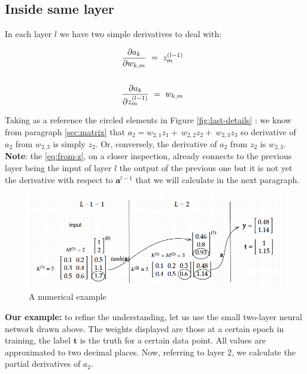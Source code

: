 \documentclass{article}
\begin{document}
\subsection{Inside same layer}\label{sec:same-layer}

In each layer $\displaystyle l$ we have two simple derivatives to deal with:

\begin{gather}
\frac{\partial a_{k}}{\partial w_{k,m}} \ =\ z_{m}^{( l-1)} \label{eq:from-w}\ \ \\
\notag\\
\frac{\partial a_{k}}{\partial z_{m}^{( l-1)}} \ =\ w_{k,m} \label{eq:from-z} \ \
\end{gather}

Taking as a reference the circled elements in Figure \ref{fig:last-details} : we know from paragraph \ref{sec:matrix} that $\displaystyle a_{2} =w_{2,1} z_{1} +\ w_{2,2} z_{2} +\ w_{2,3} z_{3}$ so derivative of $ a_2$ from $\displaystyle w_{2,3}$ is simply $\displaystyle z_{2}$. Or, conversely, the derivative of $\displaystyle a_{2}$ from $\displaystyle z_{2}$ is  $\displaystyle w_{2,3}$.\\

\textbf{Note}: the \eqref{eq:from-z}, on a closer inspection, already connects to the previous layer being the input of layer $\displaystyle l$ the output of the previous one but it is not yet the derivative with respect to $\boldsymbol{a}^{l-1}$ that we will calculate in the next paragraph.\\

\begin{figure}[H]
    \centering
    \includegraphics[width=0.8\linewidth]{images/example.png}
    \caption{A numerical example}
    \label{fig:example}
\end{figure}

\textbf{Our example:} to refine the understanding, let us use the small two-layer neural network drawn above.  The weights displayed are those at a certain epoch in training, the label $\boldsymbol{t}$ is the truth for a certain data point. All values are approximated to two decimal places. Now, referring to layer 2, we calculate the partial derivatives of $a_2$.
\end{document}
